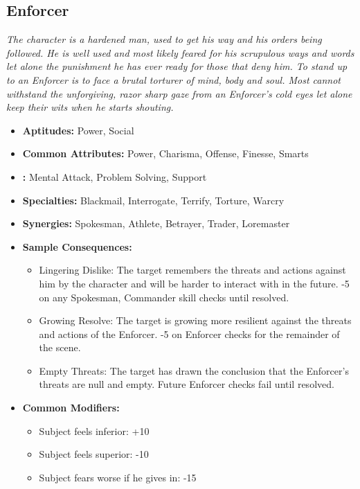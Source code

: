 \subsection{Enforcer}\label{Enforcer}
\textit{The character is a hardened man, used to get his way and his orders being followed. 
He is well used and most likely feared for his scrupulous ways and words let alone the punishment he has ever ready for those that deny him.
To stand up to an Enforcer is to face a brutal torturer of mind, body and soul. 
Most cannot withstand the unforgiving, razor sharp gaze from an Enforcer's cold eyes let alone keep their wits when he starts shouting.}
\begin{itemize}
	\item \textbf{Aptitudes:} Power, Social
	\item \textbf{Common Attributes:} Power, Charisma, Offense, Finesse, Smarts
	\item \textbf{:} Mental Attack, Problem Solving, Support
	\item \textbf{Specialties:} Blackmail, Interrogate, Terrify, Torture, Warcry
	\item \textbf{Synergies:} Spokesman, Athlete, Betrayer, Trader, Loremaster
	\item \textbf{Sample Consequences:} 
	\begin{itemize}
		\item Lingering Dislike: The target remembers the threats and actions against him by the character and will be harder to interact with in the future. -5 on any Spokesman, Commander skill checks until resolved.
		\item Growing Resolve: The target is  growing more resilient against the threats and actions of the Enforcer. -5 on Enforcer checks for the remainder of the scene.
		\item Empty Threats: The target has drawn the conclusion that the Enforcer's threats are null and empty. Future Enforcer checks fail until resolved.
	\end{itemize}
	\item \textbf{Common Modifiers:}
	\begin{itemize}
		\item Subject feels inferior: +10
		\item Subject feels superior: -10
		\item Subject fears worse if he gives in: -15 
	\end{itemize}
\end{itemize}

